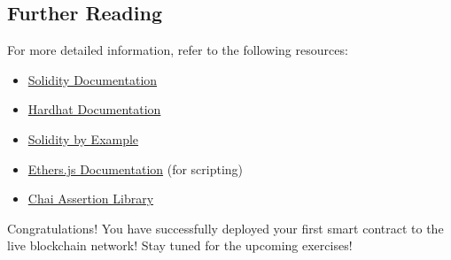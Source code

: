 \documentclass[12pt]{article}
\begin{document}
\subsection{Further Reading}

For more detailed information, refer to the following resources:

\begin{itemize}
    \item \href{https://docs.soliditylang.org/en/latest/}{Solidity Documentation}
    \item \href{https://hardhat.org/docs}{Hardhat Documentation}
    \item \href{https://solidity-by-example.org/}{Solidity by Example}
    \item \href{https://docs.ethers.org/v6/}{Ethers.js Documentation} (for scripting)
    \item \href{https://www.chaijs.com/}{Chai Assertion Library}

\end{itemize}
Congratulations! You have successfully deployed your first smart contract to the live blockchain network! Stay tuned for the upcoming exercises!
\end{document}
